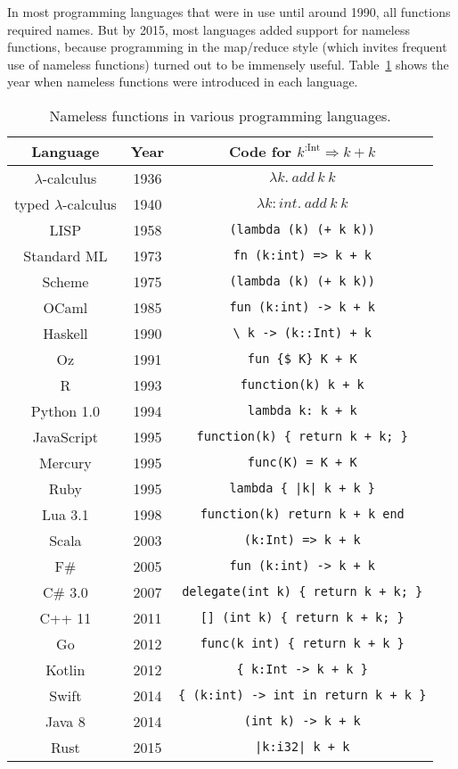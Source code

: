 In most programming languages that were in use until around 1990,
all functions required names. But by 2015, most languages added support
for nameless functions, because programming in the map/reduce style
(which invites frequent use of nameless functions) turned out to be
immensely useful. Table\ \ref{lambda-functions-table} shows the
year when nameless functions were introduced in each language.

\begin{table}
\begin{centering}
\begin{tabular}{|c|c|c|}
\hline 
\textbf{Language } & \textbf{Year} & \textbf{Code for }$k^{:\text{Int}}\Rightarrow k+k$\tabularnewline
\hline 
\hline 
$\lambda$-calculus & 1936 & $\lambda k.~add~k~k$\tabularnewline
\hline 
typed $\lambda$-calculus & 1940 & $\lambda k:int.~add~k~k$\tabularnewline
\hline 
LISP & 1958 & \texttt{\footnotesize{}(lambda (k) (+ k k))}\tabularnewline
\hline 
Standard ML & 1973 & \texttt{\footnotesize{}fn (k:int) => k + k}\tabularnewline
\hline 
Scheme & 1975 & \texttt{\footnotesize{}(lambda (k) (+ k k))}\tabularnewline
\hline 
OCaml & 1985 & \texttt{\footnotesize{}fun (k:int) -> k + k}\tabularnewline
\hline 
Haskell  & 1990 & \texttt{\footnotesize{}\textbackslash{} k -> (k::Int) + k}\tabularnewline
\hline 
Oz & 1991 & \texttt{\footnotesize{}fun \{\$ K\} K + K}\tabularnewline
\hline 
R  & 1993 & \texttt{\footnotesize{}function(k) k + k}\tabularnewline
\hline 
Python 1.0 & 1994 & \texttt{\footnotesize{}lambda k: k + k}\tabularnewline
\hline 
JavaScript  & 1995 & \texttt{\footnotesize{}function(k) \{ return k + k; \}}\tabularnewline
\hline 
Mercury  & 1995 & \texttt{\footnotesize{}func(K) = K + K}\tabularnewline
\hline 
Ruby  & 1995 & \texttt{\footnotesize{}lambda \{ |k| k + k \}}\tabularnewline
\hline 
Lua 3.1 & 1998 & \texttt{\footnotesize{}function(k) return k + k end}\tabularnewline
\hline 
Scala  & 2003 & \texttt{\footnotesize{}(k:Int) => k + k}\tabularnewline
\hline 
F\# & 2005 & \texttt{\footnotesize{}fun (k:int) -> k + k}\tabularnewline
\hline 
C\# 3.0 & 2007 & \texttt{\footnotesize{}delegate(int k) \{ return k + k; \}}\tabularnewline
\hline 
C++ 11 & 2011 & \texttt{\footnotesize{}{[}{]} (int k) \{ return k + k; \}}\tabularnewline
\hline 
Go & 2012 & \texttt{\footnotesize{}func(k int) \{ return k + k \}}\tabularnewline
\hline 
Kotlin & 2012 & \texttt{\footnotesize{}\{ k:Int -> k + k \}}\tabularnewline
\hline 
Swift  & 2014 & \texttt{\footnotesize{}\{ (k:int) -> int in return k + k \}}\tabularnewline
\hline 
Java 8 & 2014 & \texttt{\footnotesize{}(int k) -> k + k}\tabularnewline
\hline 
Rust & 2015 & \texttt{\footnotesize{}|k:i32| k + k}\tabularnewline
\hline 
\end{tabular}
\par\end{centering}
\caption{Nameless functions in various programming languages.}
\label{lambda-functions-table}
\end{table}

